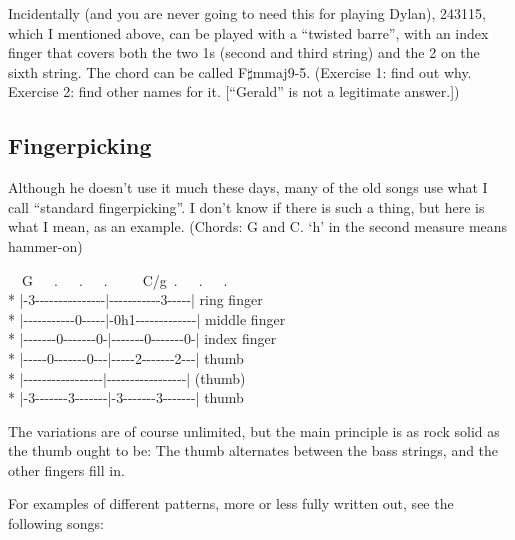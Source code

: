 \begin{articlelayout}
Incidentally (and you are never going to need this for playing Dylan),
243115, which I mentioned above, can be played with a ``{}twisted barre''{}, with an index
finger that covers both the two 1s (second and third string) and the 2
on the sixth string. The chord can be called
F$\sharp$mmaj9-5. (Exercise 1: find out why. Exercise 2: find other
names for it. [``{}Gerald''{} is not a legitimate answer.])


\subsection*{Fingerpicking}

Although he doesn't use it much these days, many of the old songs use
what I call ``{}standard fingerpicking''{}. I don't know if there is
such a thing, but here is what I mean, as an example. (Chords: G and
C. `{}h'{} in the second measure means hammer-on)

\begin{pre}
\begin{adjustwidth}{2em}{0em}
~~G~~~.~~~.~~~.~~~~~C/g~.~~~.~~~.\\*
|{-}3{-}{-}{-}{-}{-}{-}{-}{-}{-}{-}{-}{-}{-}{-}{-}|{-}{-}{-}{-}{-}{-}{-}{-}{-}{-}{-}3{-}{-}{-}{-}{-}| ring finger\\*
|{-}{-}{-}{-}{-}{-}{-}{-}{-}{-}{-}0{-}{-}{-}{-}{-}|{-}0h1{-}{-}{-}{-}{-}{-}{-}{-}{-}{-}{-}{-}{-}| middle finger\\*
|{-}{-}{-}{-}{-}{-}{-}0{-}{-}{-}{-}{-}{-}{-}0{-}|{-}{-}{-}{-}{-}{-}{-}0{-}{-}{-}{-}{-}{-}{-}0{-}| index finger\\*
|{-}{-}{-}{-}{-}0{-}{-}{-}{-}{-}{-}{-}0{-}{-}{-}|{-}{-}{-}{-}{-}2{-}{-}{-}{-}{-}{-}{-}2{-}{-}{-}| thumb\\*
|{-}{-}{-}{-}{-}{-}{-}{-}{-}{-}{-}{-}{-}{-}{-}{-}{-}|{-}{-}{-}{-}{-}{-}{-}{-}{-}{-}{-}{-}{-}{-}{-}{-}{-}| (thumb)\\*
|{-}3{-}{-}{-}{-}{-}{-}{-}3{-}{-}{-}{-}{-}{-}{-}|{-}3{-}{-}{-}{-}{-}{-}{-}3{-}{-}{-}{-}{-}{-}{-}| thumb
\end{adjustwidth}
\end{pre}

The variations are of course unlimited, but the main principle is as
rock solid as the thumb ought to be: The thumb alternates between the
bass strings, and the other fingers fill in.

For examples of different patterns, more or less fully written out,
see the following songs:


\end{articlelayout}
